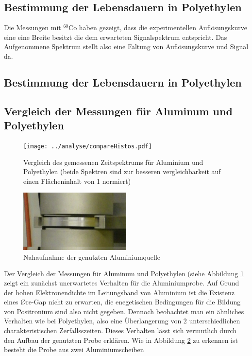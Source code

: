 \documentclass[a4paper,12pt]{article}
\begin{document}
\subsection{Bestimmung der Lebensdauern in Polyethylen}
	Die Messungen mit $^{60}$Co haben gezeigt, dass die experimentellen Auflösungskurve eine eine Breite besitzt die dem erwarteten Signalspektrum entspricht. Das Aufgenommene Spektrum
	stellt also eine Faltung von Auflösungskurve und Signal da.
\subsection{Bestimmung der Lebensdauern in Polyethylen}
	

\subsection{Vergleich der Messungen für Aluminum und Polyethylen}
	\begin{figure}
	\texttt{[image: ../analyse/compareHistos.pdf]}
	\caption{Vergleich des gemessenen Zeitspektrums für Aluminium und Polyethylen (beide Spektren sind zur besseren vergleichbarkeit auf einen Flächeninhalt von 1 normiert) }
	\label{fig:compare_signal}
	\end{figure}
	\begin{figure}
	\includegraphics[width=0.5\textwidth]{../pictures/quelle_nah.jpg}
	\caption{Nahaufnahme der genutzten Aluminiumquelle }
	\label{fig:quelle_nah}
	\end{figure}
		Der Vergleich der Messungen für Aluminum und Polyethylen (siehe Abbildung \ref{fig:compare_signal}  zeigt ein zunächst unerwartetes Verhalten für 
		die Aluminiumprobe. Auf Grund der hohen Elektronendichte im Leitungsband von Aluminium ist die Existenz eines Øre-Gap nicht zu erwarten, die 
		enegetischen Bedingungen für die Bildung von Positronium sind also nicht gegeben. Dennoch beobachtet man ein ähnliches Verhalten wie bei 
		Polyethylen, also eine Überlangerung von 2 unterschiedlichen charakteristischen Zerfallsszeiten. Dieses Verhalten lässt sich vermutlich durch
		den Aufbau der genutzten Probe erklären. Wie in Abbildung \ref{fig:quelle_nah} zu erkennen ist besteht die Probe aus zwei Aluminiumscheiben
\end{document}
